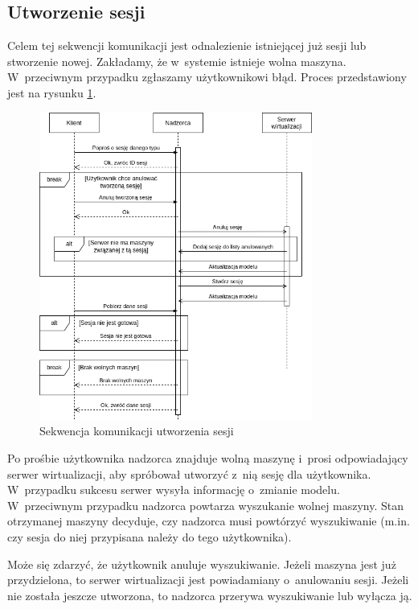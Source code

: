 \documentclass[../opis-rozwiazania.tex]{subfiles}
\begin{document}
\label{communication-sec}

\subsection{Utworzenie sesji}

Celem tej sekwencji komunikacji jest odnalezienie istniejącej już sesji lub stworzenie nowej.
Zakładamy, że w~systemie istnieje wolna maszyna.
W~przeciwnym przypadku zgłaszamy użytkownikowi błąd. Proces przedstawiony jest na rysunku \ref{figure:diagrams:sequence_diagrams:tworzenie_sesji}.

\begin{figure}[ht!]
  \centering
  \includegraphics[width=0.8\textwidth]{../diagrams/sequence_diagrams/tworzenie_sesji.png}
  \caption{Sekwencja komunikacji utworzenia sesji}
  \label{figure:diagrams:sequence_diagrams:tworzenie_sesji}
\end{figure}

Po prośbie użytkownika nadzorca znajduje wolną maszynę i~prosi odpowiadający serwer wirtualizacji, aby spróbował utworzyć z~nią sesję dla użytkownika.
W~przypadku sukcesu serwer wysyła informację o~zmianie modelu.
W~przeciwnym przypadku nadzorca powtarza wyszukanie wolnej maszyny.
Stan otrzymanej maszyny decyduje, czy nadzorca musi powtórzyć wyszukiwanie (m.in. czy sesja do niej przypisana należy do tego użytkownika).

Może się zdarzyć, że użytkownik anuluje wyszukiwanie.
Jeżeli maszyna jest już przydzielona, to serwer wirtualizacji jest powiadamiany o~anulowaniu sesji.
Jeżeli nie została jeszcze utworzona, to nadzorca przerywa wyszukiwanie lub wyłącza ją.
\end{document}
